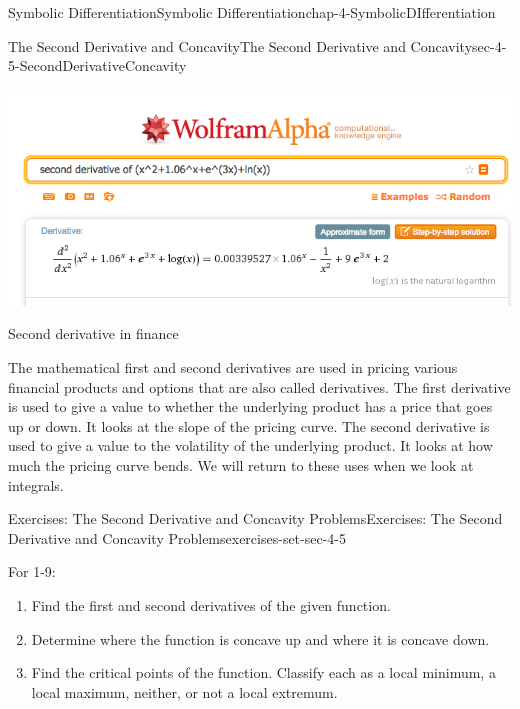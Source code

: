\documentclass[oneside,10pt,]{book}
\numberwithin{equation}{section}
\begin{document}
\begin{chapterptx}{Symbolic Differentiation}{}{Symbolic Differentiation}{}{}{chap-4-SymbolicDIfferentiation}
\begin{sectionptx}{The Second Derivative and Concavity}{}{The Second Derivative and Concavity}{}{}{sec-4-5-SecondDerivativeConcavity}
\begin{sidebyside}{1}{0.1}{0.1}{0}
\begin{sbspanel}{0.8}
\includegraphics[width=1\linewidth]{images/sec4-5-4.png}
\end{sbspanel}%
\end{sidebyside}%
\par
\hypertarget{p-1818}{}%
Second derivative in finance%
\par
\hypertarget{p-1819}{}%
The mathematical first and second derivatives are used in pricing various financial products and options that are also called derivatives.  The first derivative is used to give a value to whether the underlying product has a price that goes up or down.  It looks at the slope of the pricing curve.  The second derivative is used to give a value to the volatility of the underlying product.  It looks at how much the pricing curve bends.  We will return to these uses when we look at integrals.%
%
%
\typeout{************************************************}
\typeout{************************************************}
%
\begin{exercises-subsection-numberless}{Exercises: The Second Derivative and Concavity Problems}{}{Exercises: The Second Derivative and Concavity Problems}{}{}{exercises-set-sec-4-5}
\par\medskip\noindent%
\hypertarget{exercisegroup-21}{}%
\hypertarget{p-1820}{}%
For 1-9:%
\leavevmode%
\begin{enumerate}[label=(\alph*)]
\item\hypertarget{li-540}{}\hypertarget{p-1821}{}%
Find the first and second derivatives of the given function.%
\item\hypertarget{li-541}{}\hypertarget{p-1822}{}%
Determine where the function is concave up and where it is concave down.%
\item\hypertarget{li-542}{}\hypertarget{p-1823}{}%
Find the critical points of the function.  Classify each as a local minimum, a local maximum, neither, or not a local extremum.%
\end{enumerate}

\end{exercises-subsection-numberless}
\end{sectionptx}
\end{chapterptx}
\end{document}
